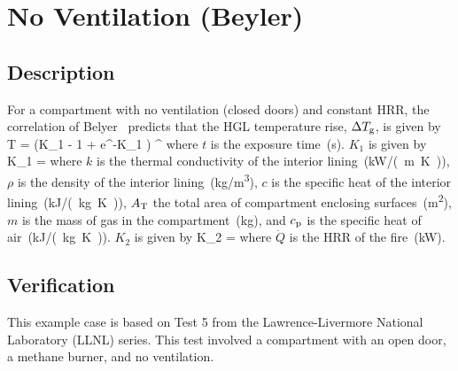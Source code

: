 \clearpage


\section{No Ventilation (Beyler)}

\subsection*{Description}

For a compartment with no ventilation (closed doors) and constant HRR, the correlation of Belyer~\cite{SFPE:Walton} predicts that the HGL temperature rise, $\Delta T\sb{g}$, is given by
\be
\Delta T =  (K_1  - 1 + e^{-K_1 }) \quad ^
\label{eq:Beyler}
\ee
where $t$ is the exposure time~(\si{\second}). $K_1$ is given by
\be
K_1 = 
\label{eq:Beyler_K1}
\ee
where $k$ is the thermal conductivity of the interior lining~(\si{kW/(m.K)}), $\rho$ is the density of the interior lining~(\si{kg/m^3}), $c$ is the specific heat of the interior lining~(\si{kJ/(kg.K)}), $A\sb{T}$ the total area of compartment enclosing surfaces~(\si{m^2}), $m$ is the mass of gas in the compartment~(\si{kg}), and $c\sb{p}$ is the specific heat of air~(\si{kJ/(kg.K)}). $K_2$ is given by
\be
K_2 = 
\label{eq:Beyler_K2}
\ee
where $\dot Q$ is the HRR of the fire~(\si{kW}).

\subsection*{Verification}

This example case is based on Test 5 from the Lawrence-Livermore National Laboratory (LLNL) series. This test involved a compartment with an open door, a methane burner, and no ventilation.

